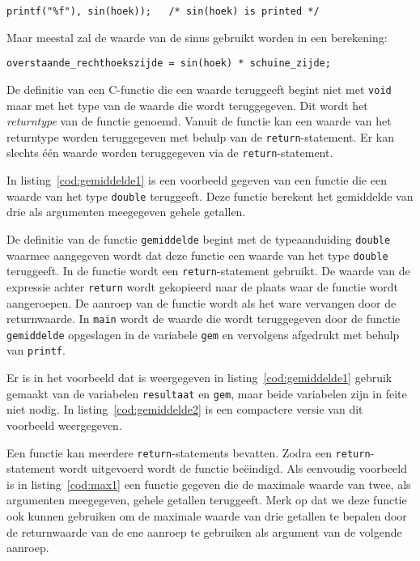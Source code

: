 \hspace*{1em}\texttt{printf("\%f"), sin(hoek)); \ \ /* sin(hoek) is printed */}

Maar meestal zal de waarde van de sinus gebruikt worden in een berekening:

\hspace*{1em}\texttt{overstaande\_rechthoekszijde = sin(hoek) * schuine\_zijde;}

De definitie van een C-functie die een waarde teruggeeft begint niet met \texttt{void} maar met het type van de waarde die wordt teruggegeven.
Dit wordt het \textsl{returntype} van de functie genoemd.
Vanuit de functie kan een waarde van het returntype worden teruggegeven met behulp van de \texttt{return}-statement.
Er kan slechts één waarde worden teruggegeven via de \texttt{return}-statement.

In listing~\ref{cod:gemiddelde1} is een voorbeeld gegeven van een functie die een waarde van het type \texttt{double} teruggeeft.
Deze functie berekent het gemiddelde van drie als argumenten meegegeven gehele getallen.
  

De definitie van de functie \texttt{gemiddelde} begint met de typeaanduiding \texttt{double} waarmee aangegeven wordt dat deze functie een waarde van het type \texttt{double} teruggeeft.
In de functie wordt een \texttt{return}-statement gebruikt.
De waarde van de expressie achter \texttt{return} wordt gekopieerd naar de plaats waar de functie wordt aangeroepen.
De aanroep van de functie wordt als het ware vervangen door de returnwaarde.
In \texttt{main} wordt de waarde die wordt teruggegeven door de functie \texttt{gemiddelde} opgeslagen in de variabele \texttt{gem} en vervolgens afgedrukt met behulp van \texttt{printf}.

Er is in het voorbeeld dat is weergegeven in listing~\ref{cod:gemiddelde1} gebruik gemaakt van de variabelen \texttt{resultaat} en \texttt{gem}, maar beide variabelen zijn in feite niet nodig.
In listing~\ref{cod:gemiddelde2} is een compactere versie van dit voorbeeld weergegeven.


Een functie kan meerdere \texttt{return}-statements bevatten. 
Zodra een \texttt{return}-statement wordt uitgevoerd wordt de functie beëindigd.
Als eenvoudig voorbeeld is in listing~\ref{cod:max1} een functie gegeven die de maximale waarde van twee, als argumenten meegegeven, gehele getallen teruggeeft.
Merk op dat we deze functie ook kunnen gebruiken om de maximale waarde van drie getallen te bepalen door de returnwaarde van de ene aanroep te gebruiken als argument van de volgende aanroep. 

